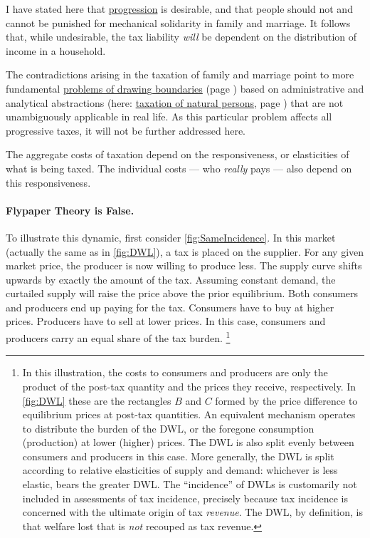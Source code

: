 I have stated here that \href{des:SharpProgression}{progression} is desirable, and that people should not and cannot be punished for mechanical solidarity in family and marriage.
It follows that, while undesirable, the tax liability \emph{will} be dependent on the distribution of income in a household.

The contradictions arising in the taxation of family and marriage point to more fundamental \href{sec:WorkPlay}{problems of drawing boundaries} (page \pageref{sec:WorkPlay}) based on administrative and analytical abstractions (here:
\hyperref[des:PersonalTaxation]{taxation of natural persons}, page \pageref{des:PersonalTaxation}) that are not unambiguously applicable in real life.
As this particular problem affects all progressive taxes, it will not be further addressed here.

 The aggregate costs of taxation depend on the responsiveness, or elasticities of what is being taxed.
The individual costs --- who \emph{really} pays --- also depend on this responsiveness.

\paragraph{Flypaper Theory is False.}
To illustrate this dynamic, first consider \autoref{fig:SameIncidence}.
In this market (actually the same as in \autoref{fig:DWL}), a tax is placed on the supplier.
For any given market price, the producer is now willing to produce less.
The supply curve shifts upwards by exactly the amount of the tax.
Assuming constant demand, the curtailed supply will raise the price above the prior equilibrium.
Both consumers and producers end up paying for the tax.
Consumers have to buy at higher prices.
Producers have to sell at lower prices.
In this case, consumers and producers carry an equal share of the tax burden.
\footnote{
	In this illustration, the costs to consumers and producers are only the product of the post-tax quantity and the prices they receive, respectively.
	In \autoref{fig:DWL} these are the rectangles $B$ and $C$ formed by the price difference to equilibrium prices at post-tax quantities.
	An equivalent mechanism operates to distribute the burden of the DWL, or the foregone consumption (production) at lower (higher) prices.
	The DWL is also split evenly between consumers and producers in this case.
	More generally, the DWL is split according to relative elasticities of supply and demand:
	whichever is less elastic, bears the greater DWL.
	The ``incidence'' of DWLs is customarily not included in assessments of tax incidence, precisely because tax incidence is concerned with the ultimate origin of tax \emph{revenue}.
	The DWL, by definition, is that welfare lost that is \emph{not} recouped as tax revenue.
}

